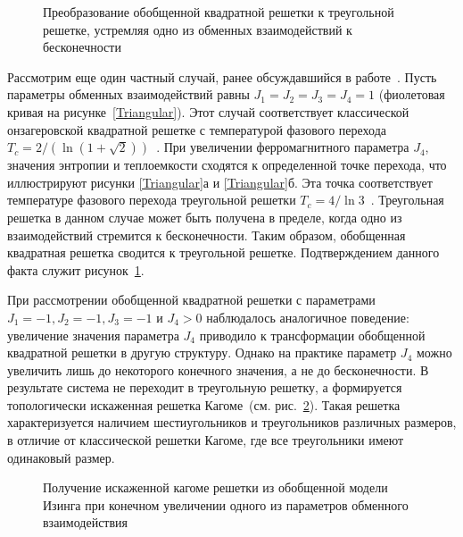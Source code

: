 \documentclass[utf8,12pt]{jetp}
\begin{document}
\begin{figure}[h]
	\caption{Преобразование обобщенной квадратной решетки к треугольной решетке, устремляя одно из обменных взаимодействий к бесконечности}
	\label{triag}
\end{figure}

Рассмотрим еще один частный случай, ранее обсуждавшийся в работе~\cite{generalizedIsing2021}. Пусть параметры обменных взаимодействий равны $J_1 = J_2 = J_3 = J_4 = 1$ (фиолетовая кривая на рисунке~\ref{Triangular}). Этот случай соответствует классической онзагеровской квадратной решетке с температурой фазового перехода $T_c = 2/(\ln (1+\sqrt{2}))$~\cite{kramers_wannier1, kramers_wannier2}. При увеличении ферромагнитного параметра $J_4$, значения энтропии и теплоемкости сходятся к определенной точке перехода, что иллюстрируют рисунки \ref{Triangular}а и \ref{Triangular}б. Эта точка соответствует температуре фазового перехода треугольной решетки $T_c = 4/\ln 3$~\cite{wannier1950}. Треугольная решетка в данном случае может быть получена в пределе, когда одно из взаимодействий стремится к бесконечности. Таким образом, обобщенная квадратная решетка сводится к треугольной решетке. Подтверждением данного факта служит рисунок~\ref{triag}. 

При рассмотрении обобщенной квадратной решетки с параметрами $J_1 = -1, J_2 = -1, J_3 = -1$ и $J_4 > 0$ наблюдалось аналогичное поведение: увеличение значения параметра $J_4$ приводило к трансформации обобщенной квадратной решетки в другую структуру. Однако на практике параметр $J_4$ можно увеличить лишь до некоторого конечного значения, а не до бесконечности. В результате система не переходит в треугольную решетку, а формируется топологически искаженная решетка Кагоме~(см. рис.~\ref{kagomelike}). Такая решетка характеризуется наличием шестиугольников и треугольников различных размеров, в отличие от классической решетки Кагоме, где все треугольники имеют одинаковый размер. 

\begin{figure}[h]
	\caption{Получение искаженной кагоме решетки из обобщенной модели Изинга при конечном увеличении одного из параметров обменного взаимодействия}
	\label{kagomelike}
\end{figure}
\end{document}
